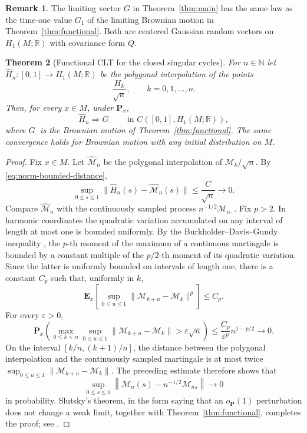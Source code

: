 \documentclass[a4paper,reqno]{amsart}
\newcommand{\R}{\mathbb R}
\newcommand{\Pp}{\mathbf P}
\newtheorem{theorem}{Theorem}[section]
\theoremstyle{definition}
\newtheorem{remark}[theorem]{Remark}
\begin{document}
\begin{remark}
The limiting vector $G$ in Theorem~\ref{thm:main} has the same law as the time-one value $G_1$ of the limiting Brownian motion in Theorem~\ref{thm:functional}.  Both are centered Gaussian random vectors on $H_1(M;\R)$ with covariance form $Q$.
\end{remark}

\begin{theorem}[Functional CLT for the closed singular cycles]\label{thm:functional-H}
For $n\in\mathbb N$ let $\widehat H_n:[0,1]\to H_1(M;\R)$ be the polygonal
interpolation of the points
\[
   \frac{H_k}{\sqrt n},\qquad k=0,1,\ldots,n.
\]
Then, for every $x\in M$, under $\Pp_x$,
\[
   \widehat H_n\Longrightarrow G_\cdot
   \qquad\text{in }C([0,1],H_1(M;\R)),
\]
where $G_\cdot$ is the Brownian motion of Theorem~\ref{thm:functional}.  The same convergence holds for Brownian motion with any initial distribution on $M$.

\end{theorem}

\begin{proof}
Fix $x\in M$.  Let $\widehat{\mathcal M}_n$ be the polygonal interpolation of
$\mathcal M_k/\sqrt n$.  By \eqref{eq:norm-bounded-distance},
\[
 \sup_{0\le s\le1}
 \|\widehat H_n(s)-\widehat{\mathcal M}_n(s)\|
 \le \frac{C}{\sqrt n}\longrightarrow0 .
\]
Compare $\widehat{\mathcal M}_n$ with the continuously sampled process
$n^{-1/2}\mathcal M_{n\cdot}$.  Fix $p>2$.  In harmonic coordinates the
quadratic variation accumulated on any interval of length at most one is
bounded uniformly.  By the Burkholder--Davis--Gundy inequality \cite[Chapter~IV]{RevuzYor}, the $p$-th moment of the maximum of a continuous martingale is bounded by a constant multiple of the $p/2$-th moment of its quadratic variation.  Since the latter is uniformly bounded on intervals of length one, there is a constant $C_p$ such that, uniformly in $k$,
\[
 \mathbf E_x\!
 \left[\sup_{0\le u\le1}
 \|\mathcal M_{k+u}-\mathcal M_k\|^p\right]\le C_p .
\]
For every $\varepsilon>0$,
\[
 \mathbf P_x\!\left(
 \max_{0\le k<n}\sup_{0\le u\le1}
 \|\mathcal M_{k+u}-\mathcal M_k\|>\varepsilon\sqrt n
 \right)
 \le \frac{C_p}{\varepsilon^p}n^{1-p/2}\longrightarrow0.
\]
On the interval $[k/n,(k+1)/n]$, the distance between the polygonal
interpolation and the continuously sampled martingale is at most twice
$\sup_{0\le u\le1}\|\mathcal M_{k+u}-\mathcal M_k\|$.  The preceding
estimate therefore shows that
\[
 \sup_{0\le s\le1}
 \left\|\widehat{\mathcal M}_n(s)-n^{-1/2}\mathcal M_{ns}\right\|
 \longrightarrow0
\]
in probability.  Slutsky's theorem, in the form saying that an $o_{\mathbf P}(1)$ perturbation does not change a weak limit, together with Theorem~\ref{thm:functional}, completes the proof; see \cite{Kallenberg}.
\end{proof}
\end{document}
